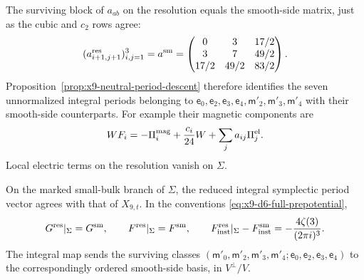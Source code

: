 The surviving block of $a_{ab}$ on the resolution equals the
smooth-side matrix, just as the cubic and $c_2$ rows agree:
\begin{equation}
 (a^{\rm res}_{i+1,j+1})_{i,j=1}^3=a^{\rm sm}
 =\begin{pmatrix}
 0&3&17/2\\3&7&49/2\\17/2&49/2&83/2
 \end{pmatrix}.
 \label{eq:x9-d6-quadratic-matrix}
\end{equation}
Proposition~\ref{prop:x9-neutral-period-descent} therefore identifies
the seven unnormalized integral periods belonging to
$\mathsf e_0,\mathsf e_2,\mathsf e_3,\mathsf e_4,
\mathsf m'_2,\mathsf m'_3,\mathsf m'_4$ with their smooth-side counterparts.
For example their magnetic components are
\begin{equation}
 W F_i=-\Pi^{\rm mag}_i+\frac{c_i}{24}W
                         +\sum_j a_{ij}\Pi^{\rm el}_j.
 \label{eq:x9-d6-seven-integral-periods}
\end{equation}
Local electric terms on the resolution vanish on $\Sigma$.

\begin{proposition}\label{prop:x9-d6-period}
On the marked small-bulk branch of $\Sigma$, the reduced integral
symplectic period vector agrees with that of $X_{9,t}$. In the
conventions \eqref{eq:x9-d6-full-prepotential},
\begin{equation}
 G^{\rm res}|_\Sigma=G^{\rm sm},\qquad
 F^{\rm res}|_\Sigma=F^{\rm sm},\qquad
 F^{\rm res}_{\rm inst}|_\Sigma-F^{\rm sm}_{\rm inst}
       =-\frac{4\zeta(3)}{(2\pi i)^3}.
 \label{eq:x9-d6-period-and-constant}
\end{equation}
The integral map sends the surviving classes
$(\mathsf m'_0,\mathsf m'_2,\mathsf m'_3,\mathsf m'_4;
\mathsf e_0,\mathsf e_2,\mathsf e_3,\mathsf e_4)$ to the correspondingly
ordered smooth-side basis, in $V^\perp/V$.
\end{proposition}

